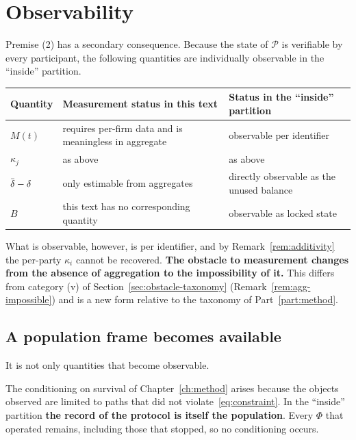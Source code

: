 \section{Observability}
\label{sec:protocol-observability}

Premise (2) has a secondary consequence. Because the state of $\mathcal{P}$ is verifiable by
every participant, the following quantities are individually observable in the ``inside''
partition.

\begin{center}
\begin{tabularx}{\textwidth}{@{}lXX@{}}
\toprule
Quantity & Measurement status in this text & Status in the ``inside'' partition \\
\midrule
$M(t)$ & requires per-firm data and is meaningless in aggregate & observable per identifier \\
$\kappa_j$ & as above & as above \\
$\dbar-\delta$ & only estimable from aggregates & directly observable as the unused balance \\
$B$ & this text has no corresponding quantity & observable as locked state \\
\bottomrule
\end{tabularx}
\label{tab:protocol-observability}
\end{center}

What is observable, however, is per identifier, and by Remark~\ref{rem:additivity} the
per-party $\kappa_i$ cannot be recovered.
\textbf{The obstacle to measurement changes from the absence of aggregation to the
impossibility of it.} This differs from category (v) of Section~\ref{sec:obstacle-taxonomy}
(Remark~\ref{rem:agg-impossible}) and is a new form relative to the taxonomy of
Part~\ref{part:method}.

\subsection{A population frame becomes available}
\label{sec:protocol-frame}

It is not only quantities that become observable.

The conditioning on survival of Chapter~\ref{ch:method} arises because the objects observed
are limited to paths that did not violate~\eqref{eq:constraint}. In the ``inside'' partition
\textbf{the record of the protocol is itself the population}. Every $\Phi$ that operated
remains, including those that stopped, so no conditioning occurs.

